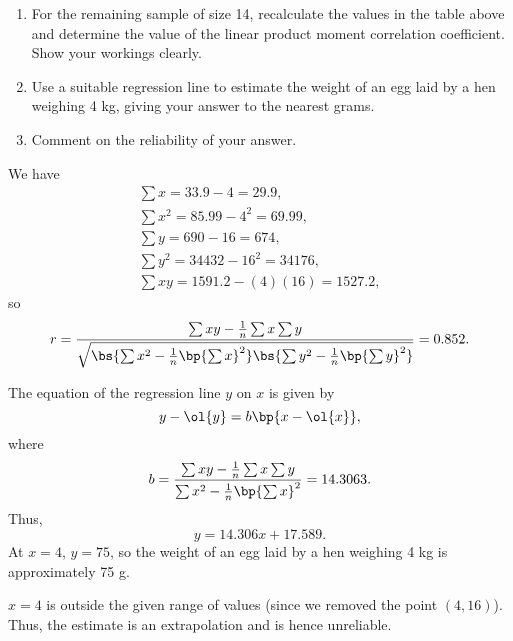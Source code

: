 \begin{problem}
    \begin{enumerate}
        \item For the remaining sample of size 14, recalculate the values in the table above and determine the value of the linear product moment correlation coefficient. Show your workings clearly.
        \item Use a suitable regression line to estimate the weight of an egg laid by a hen weighing 4 kg, giving your answer to the nearest grams.
        \item Comment on the reliability of your answer.
    \end{enumerate}
\end{problem}
\begin{solution}
    \begin{ppart}
        We have
        \begin{gather*}
            \sum x = 33.9 - 4 = 29.9,\\
            \sum x^2 = 85.99 - 4^2 = 69.99,\\
            \sum y = 690 - 16 = 674,\\
            \sum y^2 = 34432 - 16^2 = 34176,\\
            \sum xy = 1591.2 - (4)(16) = 1527.2,
        \end{gather*}
        so \[r = \frac{\sum xy - \frac1{n} \sum x \sum y}{\sqrt{\bs{\sum x^2 - \frac1n \bp{\sum x}^2} \bs{\sum y^2 - \frac1n \bp{\sum y}^2}}} = 0.852.\]
    \end{ppart}
    \begin{ppart}
        The equation of the regression line $y$ on $x$ is given by \[y - \ol{y} = b \bp{x - \ol{x}},\] where \[b = \frac{\sum xy - \frac1{n} \sum x \sum y}{\sum x^2 - \frac1n \bp{\sum x}^2} = 14.3063.\] Thus, \[y = 14.306x + 17.589.\] At $x = 4$, $y = 75$, so the weight of an egg laid by a hen weighing 4 kg is approximately 75 g.
    \end{ppart}
    \begin{ppart}
        $x = 4$ is outside the given range of values (since we removed the point $(4, 16)$). Thus, the estimate is an extrapolation and is hence unreliable.
    \end{ppart}
\end{solution}

